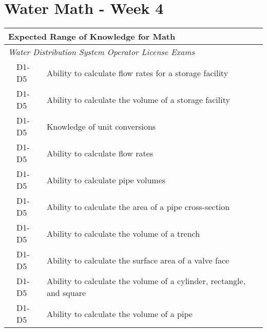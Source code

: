 \chapter{Water Math - Week 4}



\begin{table}[H]
\begin{tabular}{| m{1cm} | m{1cm} | m{12cm} |}
\hline
\multicolumn{3}{|l|}{\textbf{Expected   Range of Knowledge for Math}}                                                                      \\ \hline
\multicolumn{3}{|l|}{\textit{Water   Distribution System Operator License Exams}}                                                          \\ \hline
\multicolumn{1}{l|}{} & \multicolumn{1}{l|}{D1-D5} & Ability to calculate   flow rates for a storage facility                     \\ \cline{2-3} 
\multicolumn{1}{l|}{} & \multicolumn{1}{l|}{D1-D5} & Ability to calculate   the volume of a storage facility                      \\ \cline{2-3} 
\multicolumn{1}{l|}{} & \multicolumn{1}{l|}{D1-D5} & Knowledge of unit   conversions                                              \\ \cline{2-3} 
\multicolumn{1}{l|}{} & \multicolumn{1}{l|}{D1-D5} & Ability to calculate   flow rates                                            \\ \cline{2-3} 
\multicolumn{1}{l|}{} & \multicolumn{1}{l|}{D1-D5} & Ability to calculate   pipe volumes                                          \\ \cline{2-3} 
\multicolumn{1}{l|}{} & \multicolumn{1}{l|}{D1-D5} & Ability to calculate   the area of a pipe cross-section                      \\ \cline{2-3}
\multicolumn{1}{l|}{} & \multicolumn{1}{l|}{D1-D5} & Ability to calculate   the volume of a trench                                \\ \cline{2-3}  
\multicolumn{1}{l|}{} & \multicolumn{1}{l|}{D1-D5} & Ability to calculate   the surface area of a valve face                      \\ \cline{2-3} 
\multicolumn{1}{l|}{} & \multicolumn{1}{l|}{D1-D5} & Ability to calculate   the volume of a cylinder, rectangle, and square       \\ \cline{2-3} 
\multicolumn{1}{l|}{} & \multicolumn{1}{l|}{D1-D5} & Ability to calculate   the volume of a pipe                                  \\ \cline{2-3} 

\end{tabular}
\end{table}
